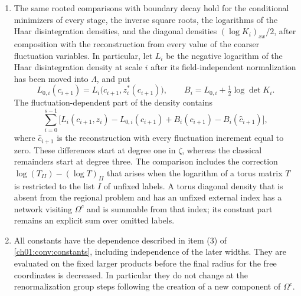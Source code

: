 \begin{theorem}
\begin{enumerate}
\[
 \Delta_i(v,\zeta;\Rec)=K_i^{\Omega,P}-K_i^{\mathbb T,\mathrm{cut}}=\sum_{\nu,\kappa}\Delta_{i;\nu\kappa}(\Rec)v^\nu\zeta^\kappa,
\]
then
\begin{equation}\label{ch17:eq:hessian-defect}
 \sup_{u\ \mathrm{unfixed}}e^{\alpha_1d_\Omega(u)}\sum_{v',\nu,\kappa}\abs{\Delta_{i;uv',\nu\kappa}(\Rec)}\,\InflatedProfile^\nu Q^{\abs\kappa}e^{a_1\Tree(u,v',\supp\nu,\supp\kappa)}\le C_J.
\end{equation}
The transposed bound holds, and so do the bounds rooted at any unfixed background or free external index, with the volume-normalized column factors of \cref{ch01:def:analytic-norms}. The underlying mixed tensors with $k$ additional background or free derivatives have bounds $C_J^{k+2}(k+2)!$ at every external index, on a fixed larger product. The auxiliary blocks have zero defect. If $\Omega^c$ is empty, the defect has zero nonconstant part.
\item The same rooted comparisons with boundary decay hold for the conditional minimizers of every stage, the inverse square roots, the logarithms of the Haar disintegration densities, and the diagonal densities $(\log K_i)_{xx}/2$, after composition with the reconstruction from every value of the coarser fluctuation variables. In particular, let $L_i$ be the negative logarithm of the Haar disintegration density at scale $i$ after its field-independent normalization has been moved into $\Lambda$, and put
\[
 L_{0,i}(c_{i+1})=L_i\bigl(c_{i+1},z_i^*(c_{i+1})\bigr),\qquad B_i=L_{0,i}+\tfrac12\log\det K_i.
\]
The fluctuation-dependent part of the density contains
\begin{equation}\label{ch17:eq:measure-fluctuation}
 \sum_{i=0}^{s-1}\bigl[L_i(c_{i+1},z_i)-L_{0,i}(c_{i+1})+B_i(c_{i+1})-B_i(\widehat c_{i+1})\bigr],
\end{equation}
where $\widehat c_{i+1}$ is the reconstruction with every fluctuation increment equal to zero. These differences start at degree one in $\zeta$, whereas the classical remainders start at degree three. The comparison includes the correction $\log(T_{II})-(\log T)_{II}$ that arises when the logarithm of a torus matrix $T$ is restricted to the list $I$ of unfixed labels. A torus diagonal density that is absent from the regional problem and has an unfixed external index has a network visiting $\Omega^c$ and is summable from that index; its constant part remains an explicit sum over omitted labels.
\item All constants have the dependence described in item (3) of \cref{ch01:conv:constants}, including independence of the later widths. They are evaluated on the fixed larger products before the final radius for the free coordinates is decreased. In particular they do not change at the renormalization group steps following the creation of a new component of $\Omega^c$.
\end{enumerate}
\end{theorem}

